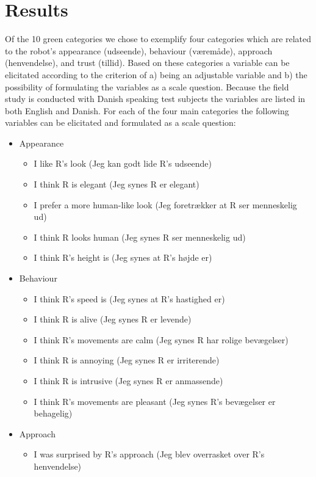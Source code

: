 \section{Results}
\label{Results}
%
Of the 10 green categories we chose to exemplify four categories which are related to the robot’s appearance (udseende), behaviour (væremåde), approach (henvendelse), and trust (tillid). Based on these categories a variable can be elicitated according to the criterion of a) being an adjustable variable and b) the possibility of formulating the variables as a scale question. Because the field study is conducted with Danish speaking test subjects the variables are listed in both English and Danish. For each of the four main categories the following variables can be elicitated and formulated as a scale question:\\
%
\begin{itemize}
\item Appearance 
  \begin{itemize}
  \item I like R's look (Jeg kan godt lide R's udseende)
  \item I think R is elegant (Jeg synes R er elegant)
  \item I prefer a more human-like look (Jeg foretrækker at R ser menneskelig ud)
  \item I think R looks human (Jeg synes R ser menneskelig ud)
  \item I think R's height is (Jeg synes at R's højde er)
\end{itemize}
\item Behaviour
  \begin{itemize}
  \item I think R's speed is (Jeg synes at R's hastighed er)
  \item I think R is alive (Jeg synes R er levende)
  \item I think R's movements are calm (Jeg synes R har rolige bevægelser)
  \item I think R is annoying (Jeg synes R er irriterende)
  \item I think R is intrusive (Jeg synes R er anmassende)
  \item I think R's movements are pleasant (Jeg synes R's bevægelser er behagelig)
\end{itemize}
\item Approach 
\begin{itemize}
  \item I was surprised by R's approach (Jeg blev overrasket over R's henvendelse)

\end{itemize}
\end{itemize}
